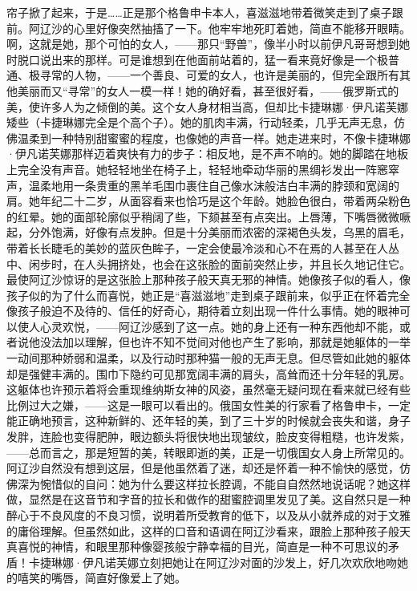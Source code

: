\par 帘子掀了起来，于是……正是那个格鲁申卡本人，喜滋滋地带着微笑走到了桌子跟前。阿辽沙的心里好像突然抽搐了一下。他牢牢地死盯着她，简直不能移开眼睛。啊，这就是她，那个可怕的女人，——那只“野兽”，像半小时以前伊凡哥哥想到她时脱口说出来的那样。可是谁想到在他面前站着的，猛一看来竟好像是一个极普通、极寻常的人物，——一个善良、可爱的女人，也许是美丽的，但完全跟所有其他美丽而又“寻常”的女人一模一样！她的确好看，甚至很好看，——俄罗斯式的美，使许多人为之倾倒的美。这个女人身材相当高，但却比卡捷琳娜·伊凡诺芙娜矮些（卡捷琳娜完全是个高个子）。她的肌肉丰满，行动轻柔，几乎无声无息，仿佛温柔到一种特别甜蜜蜜的程度，也像她的声音一样。她走进来时，不像卡捷琳娜·伊凡诺芙娜那样迈着爽快有力的步子：相反地，是不声不响的。她的脚踏在地板上完全没有声音。她轻轻地坐在椅子上，轻轻地牵动华丽的黑绸衫发出一阵窸窣声，温柔地用一条贵重的黑羊毛围巾裹住自己像水沫般洁白丰满的脖颈和宽阔的肩。她年纪二十二岁，从面容看来也恰巧是这个年龄。她脸色很白，带着两朵粉色的红晕。她的面部轮廓似乎稍阔了些，下颏甚至有点突出。上唇薄，下嘴唇微微噘起，分外饱满，好像有点发肿。但是十分美丽而浓密的深褐色头发，乌黑的眉毛，带着长长睫毛的美妙的蓝灰色眸子，一定会使最冷淡和心不在焉的人甚至在人丛中、闲步时，在人头拥挤处，也会在这张脸的面前突然止步，并且长久地记住它。最使阿辽沙惊讶的是这张脸上那种孩子般天真无邪的神情。她像孩子似的看人，像孩子似的为了什么而喜悦，她正是“喜滋滋地”走到桌子跟前来，似乎正在怀着完全像孩子般迫不及待的、信任的好奇心，期待着立刻出现一件什么事情。她的眼神可以使人心灵欢悦，——阿辽沙感到了这一点。她的身上还有一种东西他却不能，或者说他没法加以理解，但也许不知不觉间对他也产生了影响，那就是她躯体的一举一动间那种娇弱和温柔，以及行动时那种猫一般的无声无息。但尽管如此她的躯体却是强健丰满的。围巾下隐约可见那宽阔丰满的肩头，高耸而还十分年轻的乳房。这躯体也许预示着将会重现维纳斯女神的风姿，虽然毫无疑问现在看来就已经有些比例过大之嫌，——这是一眼可以看出的。俄国女性美的行家看了格鲁申卡，一定能正确地预言，这种新鲜的、还年轻的美，到了三十岁的时候就会丧失和谐，身子发胖，连脸也变得肥肿，眼边额头将很快地出现皱纹，脸皮变得粗糙，也许发紫，——总而言之，那是短暂的美，转眼即逝的美，正是一切俄国女人身上所常见的。阿辽沙自然没有想到这层，但是他虽然着了迷，却还是怀着一种不愉快的感觉，仿佛深为惋惜似的自问：她为什么要这样拉长腔调，不能自自然然地说话呢？她这样做，显然是在这音节和字音的拉长和做作的甜蜜腔调里发见了美。这自然只是一种醉心于不良风度的不良习惯，说明着所受教育的低下，以及从小就养成的对于文雅的庸俗理解。但虽然如此，这样的口音和语调在阿辽沙看来，跟脸上那种孩子般天真喜悦的神情，和眼里那种像婴孩般宁静幸福的目光，简直是一种不可思议的矛盾！卡捷琳娜·伊凡诺芙娜立刻把她让在阿辽沙对面的沙发上，好几次欢欣地吻她的嘻笑的嘴唇，简直好像爱上了她。
